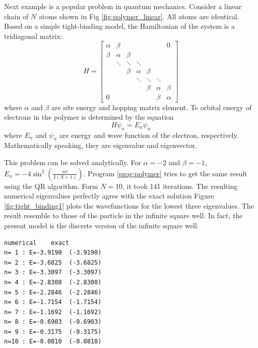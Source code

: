 {\medskip
\noindent
Next example is a popular problem in quantum mechanics.
Consider a linear chain of $N$ atoms shown in Fig \ref{fig:polymer_linear}.  All atoms are identical.  Based on a simple tight-binding model\cite{tight_binding}, the Hamiltonian of the system is a tridiagonal matrix:
\begin{equation}
H=\begin{bmatrix}
\alpha & \beta  &        &         &        &        &  0         \\
\beta  & \alpha & \beta  &         &        &        &            \\
       & \ddots & \ddots & \ddots  &        &        &            \\
       &        & \beta  & \alpha  & \beta  &        &            \\
       &        &        & \ddots  & \ddots & \ddots &            \\  
       &        &        &         & \beta  & \alpha & \beta      \\
    0  &        &        &         &        & \beta  & \alpha   
\end{bmatrix}
\end{equation}
where $\alpha$ and $\beta$ are site energy and hopping matrix element.\cite{tight_binding}
Te orbital energy of electrons in the polymer is determined by the equation
\begin{equation}
H \psi_n = E_n \psi_n
\end{equation}
where $E_n$ and $\psi_n$ are energy and wave function of the electron, respectively.  Mathematically speaking, they are eigenvalue and eigenvector.

This problem can be solved analytically.  For $\alpha=-2$ and $\beta=-1$, $E_n = -4 \sin^2 \left ( \displaystyle\frac{n \pi}{2(N+1)} \right )$.  Program \ref{prog:polymer} tries to get the same result using the QR algorithm.  Form $N=10$, it took 141 iterations. The resulting numerical eigenvalues perfectly agree with the exact solution  Figure \ref{fig:tight_binding1} plots the wavefunctions for the lowest three eigenvalues.  The result resemble to those of the particle in the infinite square well\cite{inf_well}.  In fact, the present model is the discrete version of the infinite square well.

\begin{center}
\begin{minipage}{3in}
\small
\begin{Verbatim}[frame=single]
       numerical    exact
n= 1 : E=-3.9190  (-3.9190)
n= 2 : E=-3.6825  (-3.6825)
n= 3 : E=-3.3097  (-3.3097)
n= 4 : E=-2.8308  (-2.8308)
n= 5 : E=-2.2846  (-2.2846)
n= 6 : E=-1.7154  (-1.7154)
n= 7 : E=-1.1692  (-1.1692)
n= 8 : E=-0.6903  (-0.6903)
n= 9 : E=-0.3175  (-0.3175)
n=10 : E=-0.0810  (-0.0810)
\end{Verbatim}
\normalsize
\end{minipage}
\end{center}

}
